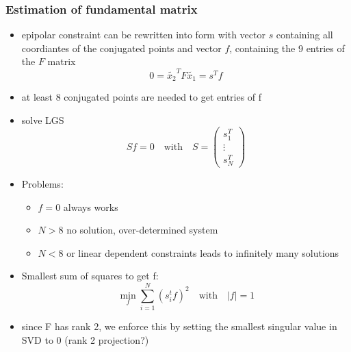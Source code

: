 \documentclass[11pt]{article}
\begin{document}
\subsubsection{Estimation of fundamental matrix}
\label{sec-6-2-3}
\begin{itemize}
\item epipolar constraint can be rewritten into form with vector $s$ containing all coordiantes
of the conjugated points and vector $f$, containing the 9 entries of the $F$ matrix
\[ 0=\tilde{x_2}^T F \tilde{x_1} = s^Tf \]
\item at least 8 conjugated points are needed to get entries of f
\item solve LGS
      \[ Sf = 0 \quad \text{with} \quad S=\begin{pmatrix}s_1^T \\ \vdots \\ s_N^T \end{pmatrix} \]
\item Problems:
\begin{itemize}
\item $f=0$ always works
\item $N>8$ no solution, over-determined system
\item $N<8$ or linear dependent constraints leads to infinitely many solutions
\end{itemize}
\item Smallest sum of squares to get f:
      \[ \min_f \sum_{i=1}^N (s_i^tf)^2 \quad \text{with}\quad |f|=1 \]
\item since F has rank 2, we enforce this by setting the smallest singular value in SVD to 0
(rank 2 projection?)
\end{itemize}
\end{document}
